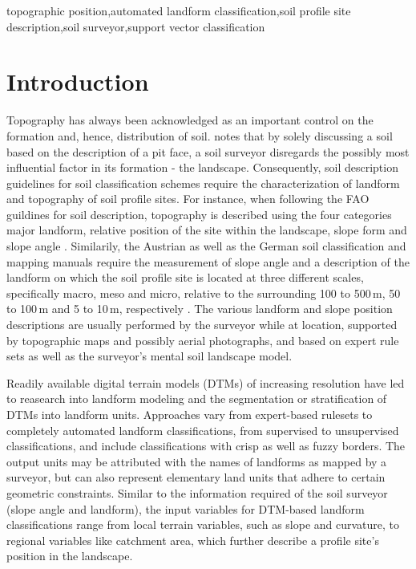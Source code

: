 \documentclass[preprint,12pt,authoryear]{elsarticle}
\begin{document}
\begin{frontmatter}
\begin{abstract}
\end{abstract}

\begin{keyword}
topographic position\sep automated landform classification\sep soil profile site description\sep soil surveyor\sep support vector classification
\end{keyword}

\end{frontmatter}

\linenumbers

\section{Introduction}
Topography has always been acknowledged as an important control on the formation and, hence, distribution of soil. \cite{Schaetzl2013} notes that by solely discussing a soil based on the description of a pit face, a soil surveyor disregards the possibly most influential factor in its formation - the landscape.	Consequently, soil description guidelines for soil classification schemes require the characterization of landform and topography of soil profile sites. For instance, when following the FAO guildines for soil description, topography is described using the four categories major landform, relative position of the site within the landscape, slope form and slope angle \citep{FAO2006}. Similarily, the Austrian \citep{Nestroy2011} as well as the German soil classification and mapping manuals \citep{ArbeitsgruppeBoden2006} require the measurement of slope angle and a description of the landform on which the soil profile site is located at three different scales, specifically macro, meso and micro, relative to the surrounding 100 to 500\,m, 50 to 100\,m and 5 to 10\,m, respectively \citep{Englisch1998}. The various landform and slope position descriptions are usually performed by the surveyor while at location, supported by topographic maps and possibly aerial photographs, and based on expert rule sets as well as the surveyor's mental soil landscape model. 

Readily available digital terrain models (DTMs) of increasing resolution have led to reasearch into landform modeling and the segmentation or stratification  of DTMs into landform units. Approaches vary from expert-based rulesets to completely automated landform classifications, from supervised to unsupervised classifications, and include classifications with crisp as well as fuzzy borders.  The output units may be attributed with the names of landforms as mapped by a surveyor, but can also represent elementary land units that adhere to certain geometric constraints. Similar to the information required of the soil surveyor (slope angle and landform), the input variables for DTM-based landform classifications range from local terrain variables, such as slope and curvature, to regional variables like catchment area, which further describe a profile site's position in the landscape.
\end{document}
